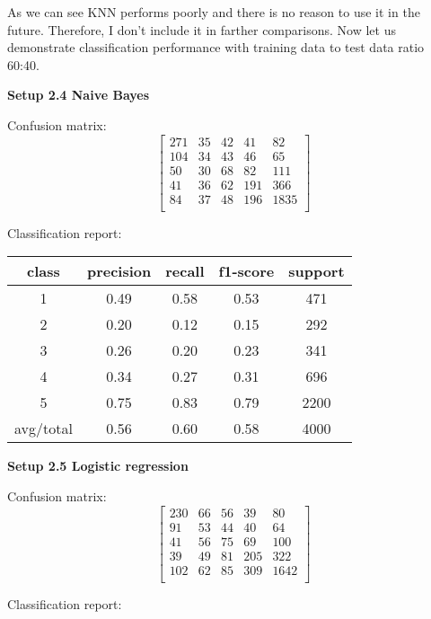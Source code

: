 \documentclass[12pt]{report}
\begin{document}
As we can see KNN performs poorly and there is no reason to use it in the future. Therefore, I don't include it in farther comparisons. Now let us demonstrate classification performance with training data to test data ratio 60:40.

\bigbreak

\textbf{Setup 2.4 Naive Bayes}

Confusion matrix:
\[
\begin{bmatrix}
271 & 35 &  42 & 41 & 82 \\
104 & 34 & 43 & 46 & 65 \\
50 & 30 & 68 & 82 & 111 \\
41 & 36 & 62 & 191 & 366 \\
84 & 37 & 48 & 196 & 1835 \\
\end{bmatrix}
\]

Classification report:

\begin{center}
	\begin{tabular}{c | c | c | c | c }
		\hline
		class & precision & recall & f1-score & support \\ \hline
		1 & 0.49 & 0.58 & 0.53 & 471 \\ \hline
		2 & 0.20 & 0.12 & 0.15 & 292 \\ \hline
		3 & 0.26 & 0.20 & 0.23 & 341 \\ \hline
		4 & 0.34 & 0.27 & 0.31 & 696 \\ \hline
		5 & 0.75 & 0.83 & 0.79 & 2200 \\ \hline
		avg/total & 0.56 & 0.60 & 0.58 & 4000 \\ \hline
	\end{tabular}
\end{center}

\textbf{Setup 2.5 Logistic regression}

Confusion matrix:
\[
\begin{bmatrix}
230 & 66 & 56 & 39 & 80 \\
91 & 53 & 44 & 40 & 64 \\
41 & 56 & 75 & 69 & 100 \\
39 & 49 & 81 & 205 & 322 \\
102 & 62 & 85 & 309 & 1642 \\
\end{bmatrix}
\]

Classification report:
\end{document}
